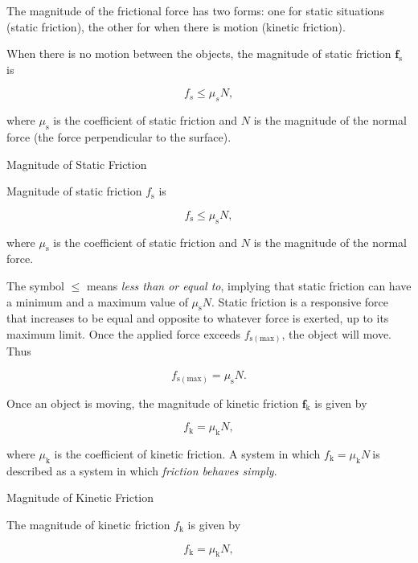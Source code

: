\documentclass[
]{book}
\begin{document}
The magnitude of the frictional force has two forms: one for static
situations (static friction), the other for when there is motion
(kinetic friction).

When there is no motion between the objects, the \protect\hypertarget{import-auto-id1165298867639}{}{magnitude of static
friction \(\mathbf{f}_{\text{s}}{}\)} is

\leavevmode{}%
\[{{{f_{s} \leq \mu_{s}}N},}{}\]

where \(\mu_{\text{s}}{}\) is the coefficient of static friction and \(N\)
is the magnitude of the normal force
\textbf{}(the force perpendicular to the
surface).

\hypertarget{fs-id1911080}{}
Magnitude of Static Friction

Magnitude of static friction \(f_{\text{s}}{}\) is

\leavevmode{}%
\[{{{f_{\text{s}} \leq \mu_{\text{s}}}N},}{}\]

where \(\mu_{\text{s}}{}\) is the coefficient of static friction and \(N\)
is the magnitude of the normal force.

The symbol \(\leq {}\) means \emph{less than or equal to}, implying that static
friction can have a minimum and a maximum value of
\({\mu_{\text{s}}N}{}\). Static friction is a responsive force that
increases to be equal and opposite to whatever force is exerted, up to
its maximum limit. Once the applied force exceeds
\(f_{\text{s}(\text{max})}{}\), the object will move. Thus

\leavevmode{}%
\[{{{f_{\text{s}(\text{max})} = \mu_{\text{s}}}N}.}{}\]

Once an object is moving, the \protect\hypertarget{import-auto-id1165298998067}{}{magnitude of kinetic friction
\(\mathbf{f}_{\text{k}}{}\)} is given by

\leavevmode{}%
\[{{{f_{\text{k}} = \mu_{\text{k}}}N},}{}\]

where \(\mu_{\text{k}}{}\) is the coefficient of kinetic friction. A
system in which \({{{f_{\text{k}} = \mu_{\text{k}}}N}\ }{}\)is described
as a system in which \emph{friction behaves simply}.

\hypertarget{fs-id1318642}{}
Magnitude of Kinetic Friction

The magnitude of kinetic friction \(f_{\text{k}}{}\) is given by

\leavevmode{}%
\[{{{f_{\text{k}} = \mu_{\text{k}}}N},}{}\]
\end{document}
